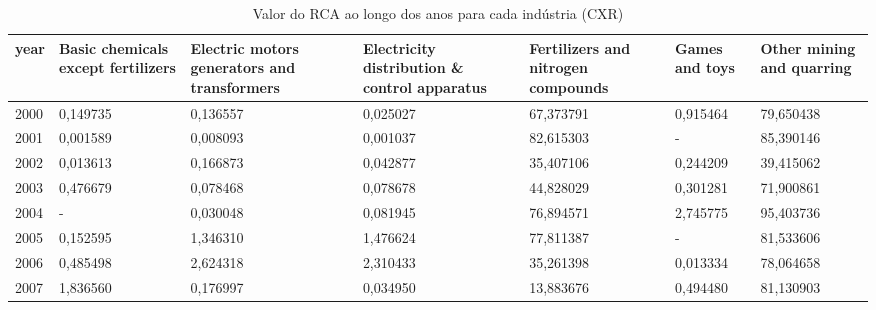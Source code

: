 \begin{table}
\centering
\caption{Valor do RCA ao longo dos anos para cada indústria (CXR)}
\begin{tabular}{p{1cm}p{2cm}p{2cm}p{2cm}p{2cm}p{2cm}p{2cm}}
\toprule
 year &  Basic chemicals except fertilizers &  Electric motors generators and transformers &  Electricity distribution \& control apparatus &  Fertilizers and nitrogen compounds &  Games and toys &  Other mining and quarring \\
\midrule
 2000 &                            0,149735 &                                     0,136557 &                                      0,025027 &                           67,373791 &        0,915464 &                  79,650438 \\
 2001 &                            0,001589 &                                     0,008093 &                                      0,001037 &                           82,615303 &               - &                  85,390146 \\
 2002 &                            0,013613 &                                     0,166873 &                                      0,042877 &                           35,407106 &        0,244209 &                  39,415062 \\
 2003 &                            0,476679 &                                     0,078468 &                                      0,078678 &                           44,828029 &        0,301281 &                  71,900861 \\
 2004 &                                   - &                                     0,030048 &                                      0,081945 &                           76,894571 &        2,745775 &                  95,403736 \\
 2005 &                            0,152595 &                                     1,346310 &                                      1,476624 &                           77,811387 &               - &                  81,533606 \\
 2006 &                            0,485498 &                                     2,624318 &                                      2,310433 &                           35,261398 &        0,013334 &                  78,064658 \\
 2007 &                            1,836560 &                                     0,176997 &                                      0,034950 &                           13,883676 &        0,494480 &                  81,130903 \\

\end{tabular}
\end{table}
